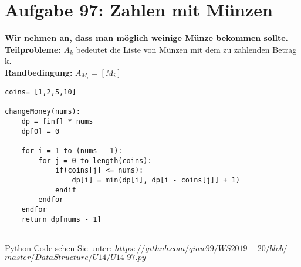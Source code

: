 \documentclass{article}
\begin{document}
\section{Aufgabe 97: Zahlen mit Münzen}
\textbf{Wir nehmen an, dass man möglich weinige Münze bekommen sollte.} \\ 
\textbf{Teilprobleme:} $A_k$ bedeutet die Liste von Münzen mit dem zu zahlenden Betrag k. \\
\textbf{Randbedingung:} $A_{M_i} = [M_i]$\\
\begin{lstlisting}
coins= [1,2,5,10]

changeMoney(nums):
	dp = [inf] * nums
	dp[0] = 0
	
	for i = 1 to (nums - 1):
		for j = 0 to length(coins):
			if(coins[j] <= nums):
				dp[i] = min(dp[i], dp[i - coins[j]] + 1)
			endif
		endfor
	endfor           
	return dp[nums - 1]
	
\end{lstlisting}
Python Code sehen Sie unter: $https://github.com/qiaw99/WS2019-20/blob/$\\$master/DataStructure/U14/U14\_97.py$
\end{document}
